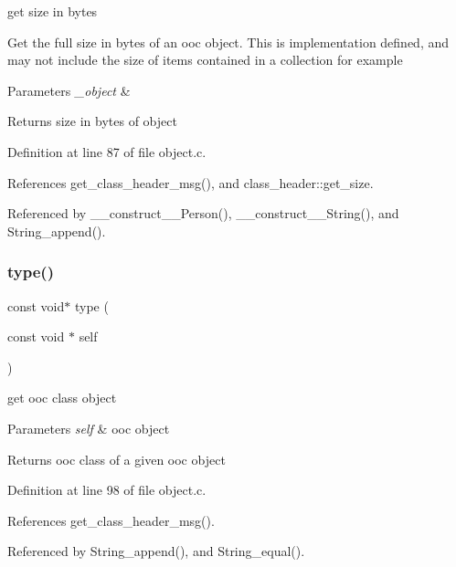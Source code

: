 get size in bytes 

Get the full size in bytes of an ooc object. This is implementation defined, and may not include the size of items contained in a collection for example 
\begin{DoxyParams}{Parameters}
{\em \+\_\+object} & \\
\hline
\end{DoxyParams}
\begin{DoxyReturn}{Returns}
size in bytes of object 
\end{DoxyReturn}


Definition at line 87 of file object.\+c.



References get\+\_\+class\+\_\+header\+\_\+msg(), and class\+\_\+header\+::get\+\_\+size.



Referenced by \+\_\+\+\_\+construct\+\_\+\+\_\+\+Person(), \+\_\+\+\_\+construct\+\_\+\+\_\+\+String(), and String\+\_\+append().

\mbox{\label{group__common_ga68940c707bbebe6946aeca72df1ee803}} 
\subsubsection{\texorpdfstring{type()}{type()}}
{\footnotesize\ttfamily const void$\ast$ type (\begin{DoxyParamCaption}\item[{const void $\ast$}]{self }\end{DoxyParamCaption})}



get ooc class object 


\begin{DoxyParams}{Parameters}
{\em self} & ooc object \\
\hline
\end{DoxyParams}
\begin{DoxyReturn}{Returns}
ooc class of a given ooc object 
\end{DoxyReturn}


Definition at line 98 of file object.\+c.



References get\+\_\+class\+\_\+header\+\_\+msg().



Referenced by String\+\_\+append(), and String\+\_\+equal().

